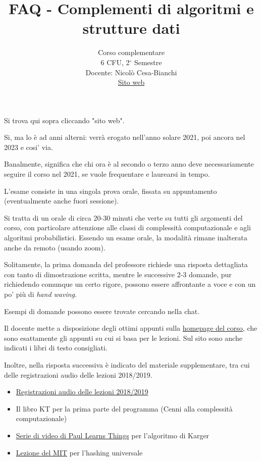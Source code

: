 \documentclass{article}
\title{FAQ - \textbf{Complementi di algoritmi e strutture dati}}
\author{
	Corso complementare \\6 CFU, 2$^{\circ}$ Semestre\\
	Docente: Nicolò Cesa-Bianchi \\ 
	\href{http://cesa-bianchi.di.unimi.it/Algo2/}{Sito web}
	\date{}
}
\begin{document}
 
\maketitle

\begin{QuestionList}

 {
    Si trova qui sopra cliccando "sito web".
}
	
 {
    Si, ma lo è ad anni alterni: verrà erogato nell'anno solare 2021, poi ancora nel 2023 e cosi' via.
    
    Banalmente, significa che chi ora è al secondo o terzo anno deve necessariamente seguire il corso nel 2021, se vuole frequentare e laurearsi in tempo.
}

 {
    L'esame consiste in una singola prova orale, fissata su appuntamento (eventualmente anche fuori sessione).
    
    Si tratta di un orale di circa 20-30 minuti che verte su tutti gli argomenti del corso, con particolare attenzione alle classi di complessità computazionale e agli algoritmi probabilistici. Essendo un esame orale, la modalità rimane inalterata anche da remoto (usando zoom).
    
    Solitamente, la prima domanda del professore richiede una risposta dettagliata con tanto di dimostrazione scritta, mentre le successive 2-3 domande, pur richiedendo comunque un certo rigore, possono essere affrontante a voce e con un po' più di \textit{hand waving}.

    Esempi di domande possono essere trovate cercando nella chat.
}

 {
    Il docente mette a disposizione degli ottimi appunti sulla \href{http://cesa-bianchi.di.unimi.it/Algo2/}{homepage del corso}, che sono esattamente gli appunti su cui si basa per le lezioni. Sul sito sono anche indicati i libri di testo consigliati.
    
    Inoltre, nella risposta successiva è indicato del materiale supplementare, tra cui delle registrazioni audio delle lezioni 2018/2019.
}

 {
    \begin{itemize}
		\item \href{https://mega.nz/\#F!4xd2gC7A!AEZhvQBEIl2ipcyHpFN-JA}{Registrazioni audio delle lezioni 2018/2019}
		
		\item Il libro KT per la prima parte del programma (Cenni alla complessità computazionale)
		
		\item \href{https://www.youtube.com/watch?v=KqMGeNZuwfI}{Serie di video di Paul Learns Things} per l'algoritmo di Karger
		
		\item \href{https://www.youtube.com/watch?v=z0lJ2k0sl1g}{Lezione del MIT} per l'hashing universale
    \end{itemize}
}

\end{QuestionList}
\end{document}
